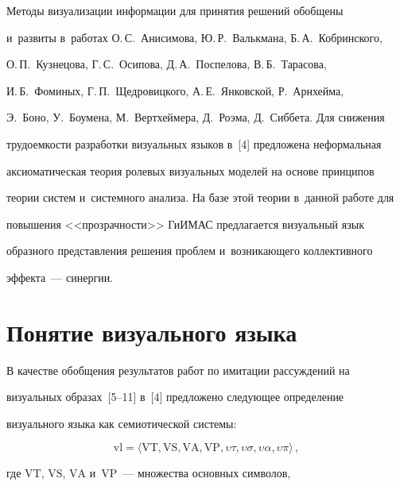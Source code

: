   


  Методы визуализации информации для принятия решений обобщены 


и~развиты в~работах О.\,С.~Анисимова, Ю.\,Р.~Валькмана, Б.\,А.~Кобринского, 


О.\,П.~Кузнецова, Г.\,С.~Осипова, Д.\,А.~Поспелова, В.\,Б.~Тарасова, 


И.\,Б.~Фоминых, Г.\,П.~Щедровицкого, А.\,Е.~Янковской, Р.~Арнхейма, 


Э.~Боно, У.~Боумена, М.~Вертхеймера, Д.~Роэма, Д.~Сиббета. Для снижения 


трудоемкости разработки визуальных языков в~[4] предложена неформальная 


аксиоматическая теория ролевых визуальных моделей на основе принципов 


теории систем и~системного анализа. На базе этой теории в~данной работе для 


повышения <<прозрачности>> \mbox{ГиИМАС} предлагается визуальный язык 


образного представления решения проб\-лем и~возникающего коллективного 


эффекта~--- синергии.


  


\section{Понятие визуального языка}





  В качестве обобщения результатов работ по имитации рассуждений на 


визуальных образах~[5--11] в~[4] предложено следующее определение 


визуального языка как семиотической системы:


  \begin{equation}


  \mathrm{vl}=\langle 


  \mathrm{VT}, \mathrm{VS}, \mathrm{VA}, \mathrm{VP}, \upsilon\tau, \upsilon \sigma, \upsilon \alpha, \upsilon 


\pi\rangle\,,


  \label{e1-kir}


  \end{equation}


где $\mathrm{VT}$, $\mathrm{VS}$, $\mathrm{VA}$ и~$\mathrm{VP}$~--- множества основных символов, 


